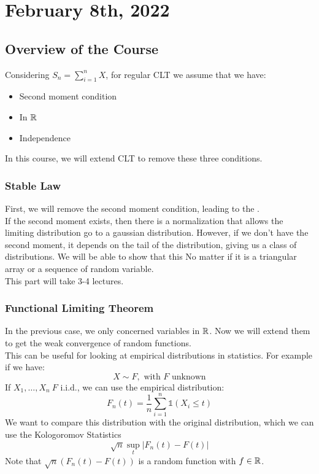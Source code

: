 \documentclass[../main/main.tex]{subfiles}
\begin{document}
\section{February 8th, 2022}
\subsection{Overview of the Course}

Considering $S_n = \sum\limits_{i=1}^{n} X$, for regular CLT we assume that we have:

\begin{itemize}
	\item Second moment condition
	\item In $\mathbb{R}$
	\item Independence
\end{itemize}

In this course, we will extend CLT to remove these three conditions.

\subsubsection{Stable Law}
First, we will remove the second moment condition, leading to the .\\

If the second moment exists, then there is a normalization that allows the limiting distribution go to a gaussian distribution. However, if we don't have the second moment, it depends on the tail of the distribution, giving us a class of distributions. We will be able to show that this
No matter if it is a triangular array or a sequence of random variable.\\

This part will take 3-4 lectures.


\subsubsection{Functional Limiting Theorem}
In the previous case, we only concerned variables in $\mathbb{R}$. Now we will extend them to get the weak convergence of random functions.\\

This can be useful for looking at empirical distributions in statistics. For example if we have: \[
	X \sim F, \text{ with $F$ unknown}
\]
If $X_1 , \ldots , X_n ~ F$ i.i.d., we can use the empirical distribution: \[
	F_n(t) = \frac{1}{n} \sum\limits_{i=1}^{n} \mathbb{1}(X_i \leq t)
\]
We want to compare this distribution with the original distribution, which we can use the Kologoromov Statistics \[
	\sqrt{n}\sup_t | F_n (t) - F(t)|
\]
Note that $\sqrt{n}(F_n(t)-F(t))$ is a random function with $f \in \mathbb{R}$.
\end{document}
